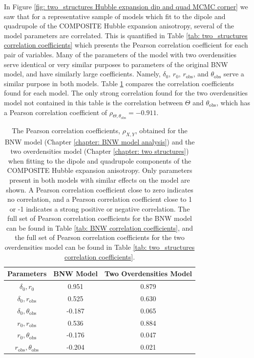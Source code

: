 \documentclass[a4paper,12pt]{report}
\begin{document}
In Figure \ref{fig: two_structures Hubble expansion dip and quad MCMC corner} we saw that for a representative sample of models which fit to the dipole and quadrupole of the COMPOSITE Hubble expansion anisotropy, several of the model parameters are correlated. This is quantified in Table \ref{tab: two_structures correlation coefficients} which presents the Pearson correlation coefficient for each pair of variables. Many of the parameters of the model with two overdensities serve identical or very similar purposes to parameters of the original BNW model, and have similarly large coefficients. Namely, $\delta_0$, $r_0$, $r_\text{obs}$, and $\theta_\text{obs}$ serve a similar purpose in both models. Table \ref{tab: comparison of correlation coefficients} compares the correlation coefficients found for each model. The only strong correlation found for the two overdensities model not contained in this table is the correlation between $\Theta$ and $\theta_\text{obs}$, which has a Pearson correlation coefficient of $\rho_{\Theta,\theta_\text{obs}}=-0.911$.

\begin{table}[htb]
    \centering
    \begin{tabular}{c|c c}
         Parameters & BNW Model & Two Overdensities Model \\
         \hline
         $\delta_0, r_0$ & 0.951 & 0.879 \\
         $\delta_0, r_\text{obs}$ & 0.525 & 0.630 \\
         $\delta_0, \theta_\text{obs}$ & -0.187 & 0.065 \\
         $r_0, r_\text{obs}$ & 0.536 & 0.884 \\
         $r_0, \theta_\text{obs}$ & -0.176 & 0.047 \\
         $r_\text{obs}, \theta_\text{obs}$ & -0.204 & 0.021
    \end{tabular}
    \caption{The Pearson correlation coefficients, $\rho_{X,Y}$, obtained for the BNW model (Chapter \ref{chapter: BNW model analysis}) and the two overdensities model (Chapter \ref{chapter: two structures}) when fitting to the dipole and quadrupole components of the COMPOSITE Hubble expansion anisotropy. Only parameters present in both models with similar effects on the model are shown. A Pearson correlation coefficient close to zero indicates no correlation, and a Pearson correlation coefficient close to 1 or -1 indicates a strong positive or negative correlation. The full set of Pearson correlation coefficients for the BNW model can be found in Table \ref{tab: BNW correlation coefficients}, and the full set of Pearson correlation coefficients for the two overdensities model can be found in Table \ref{tab: two_structures correlation coefficients}.}
    \label{tab: comparison of correlation coefficients}
\end{table}
\end{document}
